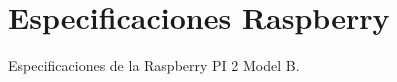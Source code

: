 
\chapter{Especificaciones Raspberry} %

\label{app:raspi-specs} %

Especificaciones de la Raspberry PI 2 Model B.

\newpage


